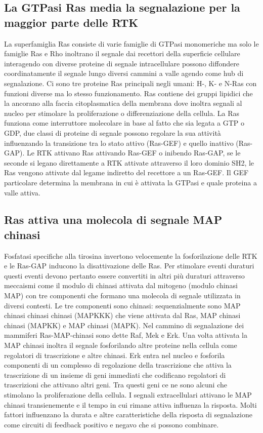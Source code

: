 \subsection{La GTPasi Ras media la segnalazione per la maggior parte delle RTK}
La superfamiglia Ras consiste di varie famiglie di GTPasi monomeriche ma solo le famiglie Ras e Rho inoltrano il segnale dai recettori della superficie cellulare interagendo con 
diverse proteine di segnale intracellulare possono diffondere coordinatamente il segnale lungo diversi cammini a valle agendo come hub di segnalazione. Ci sono tre proteine Ras 
principali negli umani: H-, K- e N-Ras con funzioni diverse ma lo stesso funzionamento. Ras contiene dei gruppi lipidici che la ancorano alla faccia citoplasmatica della membrana dove
inoltra segnali al nucleo per stimolare la proliferazione o differenziazione della cellula. La Ras funziona come interruttore molecolare in base al fatto che sia legata a GTP o GDP, due
classi di proteine di segnale possono regolare la sua attivit\`a influenzando la transizione tra lo stato attivo (Ras-GEF) e quello inattivo (Ras-GAP). Le RTK attivano Ras attivando 
Ras-GEF o inibendo Ras-GAP, se le seconde si legano direttamente a RTK attivate attraverso il loro dominio SH2, le Ras vengono attivate dal legame indiretto del recettore a un Ras-GEF. 
Il GEF particolare determina la membrana in cui \`e attivata la GTPasi e quale proteina a valle attiva. 
\subsection{Ras attiva una molecola di segnale MAP chinasi}
Fosfatasi specifiche alla tirosina invertono velocemente la fosforilazione delle RTK e le Ras-GAP inducono la disattivazione delle Ras. Per stimolare eventi duraturi questi eventi 
devono pertanto essere convertiti in altri pi\`u duraturi attraverso meccaismi come il modulo di chinasi attivata dal mitogeno (modulo chinasi MAP) con tre componenti che formano una
molecola di segnale utilizzata in diversi contesti. Le tre componenti sono chinasi: sequenzialmente sono MAP chinasi chinasi chinasi (MAPKKK) che viene attivata dal Ras, MAP chinasi
chinasi (MAPKK) e MAP chinasi (MAPK). Nel cammino di segnalazione dei mammiferi Ras-MAP-chinasi sono dette Raf, Mek e Erk. Una volta attivata la MAP chinasi inoltra il segnale 
fosforilando altre proteine nella cellula come regolatori di trascrizione e altre chinasi. Erk entra nel nucleo e fosforila componenti di un complesso di regolazione della trascrizione
che attiva la trascrizione di un insieme di geni immediati che codificano regolatori di trascrizioni che attivano altri geni. Tra questi geni ce ne sono alcuni che stimolano la 
proliferazione della cellula. I segnali extracellulari attivano le MAP chinasi transienemente e il tempo in cui rimane attiva influenza la risposta. Molti fattori influenzano la durata
e altre caratteristiche della risposta di segnalazione come circuiti di feedback positivo e negavo che si possono combinare. 
